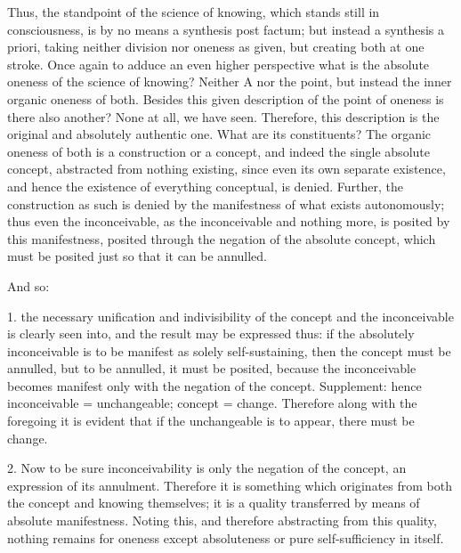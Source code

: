 Thus, the standpoint of the science of knowing,
which stands still in consciousness,
is by no means a synthesis post factum;
but instead a synthesis a priori,
taking neither division nor oneness as given,
but creating both at one stroke.
Once again to adduce an even higher perspective
what is the absolute oneness of the science of knowing?
Neither A nor the point,
but instead the inner organic oneness of both.
Besides this given description of
the point of oneness
is there also another?
None at all, we have seen.
Therefore, this description is
the original and absolutely authentic one.
What are its constituents?
The organic oneness of both is
a construction or a concept,
and indeed the single absolute concept,
abstracted from nothing existing,
since even its own separate existence,
and hence the existence of everything conceptual,
is denied.
Further, the construction as such is denied
by the manifestness of what exists autonomously;
thus even the inconceivable, as the inconceivable
and nothing more, is posited by this manifestness,
posited through the negation of the absolute concept,
which must be posited just so that it can be annulled.

And so:

1. the necessary unification and indivisibility
of the concept and the inconceivable is clearly seen into,
and the result may be expressed thus:
if the absolutely inconceivable is to be
manifest as solely self-sustaining,
then the concept must be annulled,
but to be annulled, it must be posited,
because the inconceivable becomes manifest
only with the negation of the concept.
Supplement: hence inconceivable = unchangeable; concept = change.
Therefore along with the foregoing it is evident that
if the unchangeable is to appear, there must be change.

2. Now to be sure inconceivability is only
the negation of the concept, an expression of its annulment.
Therefore it is something which originates
from both the concept and knowing themselves;
it is a quality transferred by means of absolute manifestness.
Noting this, and therefore abstracting from this quality,
nothing remains for oneness except absoluteness
or pure self-sufficiency in itself.

